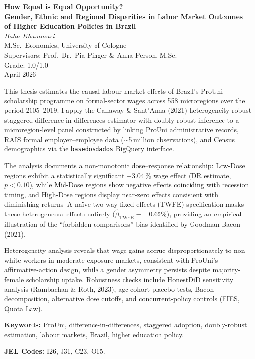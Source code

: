 \documentclass[a4paper,11pt]{article}
\begin{document}
\begin{center}
\textbf{\large How Equal is Equal Opportunity?} \\[4pt]
\textbf{Gender, Ethnic and Regional Disparities in Labor Market Outcomes \\
of Higher Education Policies in Brazil} \\[10pt]
\textit{Baha Khammari} \\
M.Sc.\ Economics, University of Cologne \\
Supervisors: Prof.\ Dr.\ Pia Pinger \& Anna Person, M.Sc. \\
Grade: 1.0/1.0 \\[6pt]
April 2026
\end{center}

\vspace{12pt}

\noindent
This thesis estimates the causal labour-market effects of Brazil's ProUni scholarship programme on formal-sector wages across 558 microregions over the period 2005--2019. I apply the Callaway \& Sant'Anna (2021) heterogeneity-robust staggered difference-in-differences estimator with doubly-robust inference to a microregion-level panel constructed by linking ProUni administrative records, RAIS formal employer--employee data ($\sim$5\,million observations), and Census demographics via the \texttt{basedosdados} BigQuery interface.

The analysis documents a non-monotonic dose--response relationship: Low-Dose regions exhibit a statistically significant +3.04\,\% wage effect (DR estimate, $p < 0.10$), while Mid-Dose regions show negative effects coinciding with recession timing, and High-Dose regions display near-zero effects consistent with diminishing returns. A na\"ive two-way fixed-effects (TWFE) specification masks these heterogeneous effects entirely ($\hat{\beta}_{\text{TWFE}} = -0.65\%$), providing an empirical illustration of the ``forbidden comparisons'' bias identified by Goodman-Bacon (2021).

Heterogeneity analysis reveals that wage gains accrue disproportionately to non-white workers in moderate-exposure markets, consistent with ProUni's affirmative-action design, while a gender asymmetry persists despite majority-female scholarship uptake. Robustness checks include HonestDiD sensitivity analysis (Rambachan \& Roth, 2023), age-cohort placebo tests, Bacon decomposition, alternative dose cutoffs, and concurrent-policy controls (FIES, Quota Law).

\vspace{8pt}
\noindent\textbf{Keywords:} ProUni, difference-in-differences, staggered adoption, doubly-robust estimation, labour markets, Brazil, higher education policy.

\vspace{4pt}
\noindent\textbf{JEL Codes:} I26, J31, C23, O15.
\end{document}
